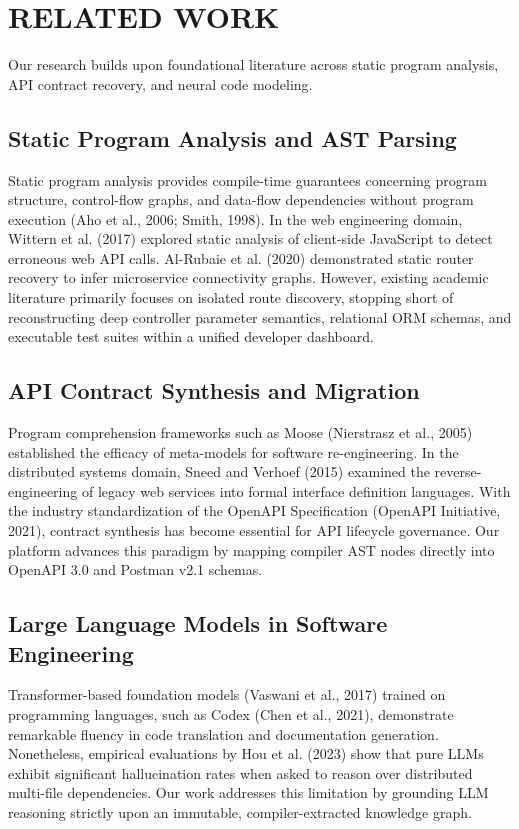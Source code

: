 \documentclass[a4paper,10pt]{article}
\begin{document}
\section{RELATED WORK}
\noindent
Our research builds upon foundational literature across static program analysis, API contract recovery, and neural code modeling.

\subsection{Static Program Analysis and AST Parsing}
\noindent
Static program analysis provides compile-time guarantees concerning program structure, control-flow graphs, and data-flow dependencies without program execution (Aho et al., 2006; Smith, 1998). In the web engineering domain, Wittern et al. (2017) explored static analysis of client-side JavaScript to detect erroneous web API calls. Al-Rubaie et al. (2020) demonstrated static router recovery to infer microservice connectivity graphs. However, existing academic literature primarily focuses on isolated route discovery, stopping short of reconstructing deep controller parameter semantics, relational ORM schemas, and executable test suites within a unified developer dashboard.

\subsection{API Contract Synthesis and Migration}
\noindent
Program comprehension frameworks such as Moose (Nierstrasz et al., 2005) established the efficacy of meta-models for software re-engineering. In the distributed systems domain, Sneed and Verhoef (2015) examined the reverse-engineering of legacy web services into formal interface definition languages. With the industry standardization of the OpenAPI Specification (OpenAPI Initiative, 2021), contract synthesis has become essential for API lifecycle governance. Our platform advances this paradigm by mapping compiler AST nodes directly into OpenAPI 3.0 and Postman v2.1 schemas.

\subsection{Large Language Models in Software Engineering}
\noindent
Transformer-based foundation models (Vaswani et al., 2017) trained on programming languages, such as Codex (Chen et al., 2021), demonstrate remarkable fluency in code translation and documentation generation. Nonetheless, empirical evaluations by Hou et al. (2023) show that pure LLMs exhibit significant hallucination rates when asked to reason over distributed multi-file dependencies. Our work addresses this limitation by grounding LLM reasoning strictly upon an immutable, compiler-extracted knowledge graph.
\end{document}
